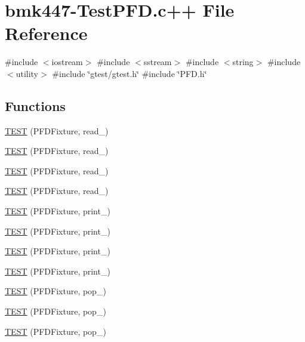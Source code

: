 \hypertarget{bmk447-TestPFD_8c_09_09}{\section{bmk447-\/\-Test\-P\-F\-D.c++ \-File \-Reference}
\label{bmk447-TestPFD_8c_09_09}
}
{\ttfamily \#include $<$iostream$>$}\*
{\ttfamily \#include $<$sstream$>$}\*
{\ttfamily \#include $<$string$>$}\*
{\ttfamily \#include $<$utility$>$}\*
{\ttfamily \#include \char`\"{}gtest/gtest.\-h\char`\"{}}\*
{\ttfamily \#include \char`\"{}\-P\-F\-D.\-h\char`\"{}}\*
\subsection*{\-Functions}
\begin{DoxyCompactItemize}
\item 
\hyperlink{bmk447-TestPFD_8c_09_09_ae2ceeb6270e4c46f9184f444c9a18803}{\-T\-E\-S\-T} (\-P\-F\-D\-Fixture, read\-\_)
\item 
\hyperlink{bmk447-TestPFD_8c_09_09_a7cbb6f2592992b1e2738ac30bd9b3179}{\-T\-E\-S\-T} (\-P\-F\-D\-Fixture, read\-\_)
\item 
\hyperlink{bmk447-TestPFD_8c_09_09_ad4d893008beebcf263d3cc3d02700f98}{\-T\-E\-S\-T} (\-P\-F\-D\-Fixture, read\-\_)
\item 
\hyperlink{bmk447-TestPFD_8c_09_09_ae7f7279201c7c97347971bf054ba765d}{\-T\-E\-S\-T} (\-P\-F\-D\-Fixture, read\-\_)
\item 
\hyperlink{bmk447-TestPFD_8c_09_09_aeb73c70e967605680ad0fd952404723a}{\-T\-E\-S\-T} (\-P\-F\-D\-Fixture, print\-\_)
\item 
\hyperlink{bmk447-TestPFD_8c_09_09_a7f9a79749e850d18f5ce2dd840bcd811}{\-T\-E\-S\-T} (\-P\-F\-D\-Fixture, print\-\_)
\item 
\hyperlink{bmk447-TestPFD_8c_09_09_a9e20949b00d611069dcdcdc5d2cb7f0d}{\-T\-E\-S\-T} (\-P\-F\-D\-Fixture, print\-\_)
\item 
\hyperlink{bmk447-TestPFD_8c_09_09_ac6c604e5ae890ed3e0ed7889af41b5ea}{\-T\-E\-S\-T} (\-P\-F\-D\-Fixture, print\-\_)
\item 
\hyperlink{bmk447-TestPFD_8c_09_09_ade50f9fc4d608fde50d8909b43827f8a}{\-T\-E\-S\-T} (\-P\-F\-D\-Fixture, pop\-\_)
\item 
\hyperlink{bmk447-TestPFD_8c_09_09_a0b4d71afee9b5f508b8af4b891394835}{\-T\-E\-S\-T} (\-P\-F\-D\-Fixture, pop\-\_)
\item 
\hyperlink{bmk447-TestPFD_8c_09_09_a6d31cfbef24abb94f985775ff0de6901}{\-T\-E\-S\-T} (\-P\-F\-D\-Fixture, pop\-\_)

\end{DoxyCompactItemize}
